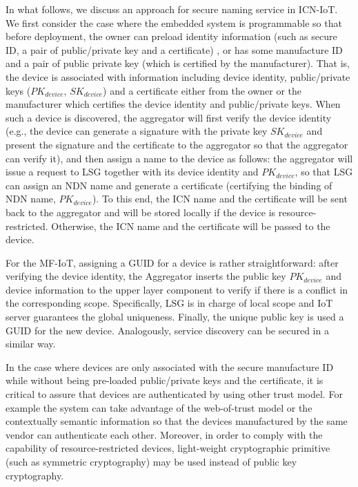 In what follows, we discuss an approach for secure naming service in
ICN-IoT.  We first consider the case where the embedded system is
programmable so that before deployment, the owner can preload
identity information (such as secure ID, a pair of public/private key
and a certificate) , or has some manufacture ID and a pair of public
private key (which is certified by the manufacturer).  That is, the
device is associated with information including device identity,
public/private keys ($PK_{device}$, $SK_{device}$) and a certificate
either from the owner or the manufacturer which certifies the device
identity and public/private keys.  When such a device is discovered,
the aggregator will first verify the device identity (e.g., the
device can generate a signature with the private key $SK_{device}$ and
present the signature and the certificate to the aggregator so that
the aggregator can verify it), and then assign a name to the device
as follows: the aggregator will issue a request to LSG together with
its device identity and $PK_{device}$, so that LSG can assign an NDN
name and generate a certificate (certifying the binding of NDN name,
$PK_{device}$).  To this end, the ICN name and the certificate will be
sent back to the aggregator and will be stored locally if the device
is resource-restricted.  Otherwise, the ICN name and the certificate
will be passed to the device.

For the MF-IoT, assigning a GUID for a device is rather
straightforward: after verifying the device identity, the Aggregator
inserts the public key $PK_{device}$ and device information to the
upper layer component to verify if there is a conflict in the
corresponding scope.  Specifically, LSG is in charge of local scope
and IoT server guarantees the global uniqueness.  Finally, the unique
public key is used a GUID for the new device.  Analogously, service
discovery can be secured in a similar way.

In the case where devices are only associated with the secure
manufacture ID while without being pre-loaded public/private keys and
the certificate, it is critical to assure that devices are
authenticated by using other trust model.  For example the system can
take advantage of the web-of-trust model or the contextually semantic
information so that the devices manufactured by the same vendor can
authenticate each other.  Moreover, in order to comply with the
capability of resource-restricted devices, light-weight cryptographic
primitive (such as symmetric cryptography) may be used instead of
public key cryptography.

